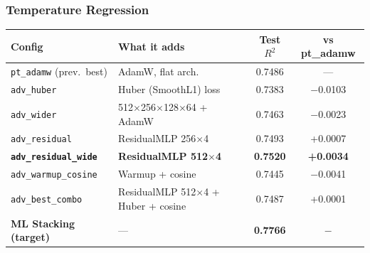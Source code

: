 \documentclass[11pt,a4paper]{article}
\begin{document}
\subsubsection*{Temperature Regression}

\begin{center}
\small
\begin{tabular}{llcc}
\toprule
\textbf{Config} & \textbf{What it adds} & \textbf{Test $R^2$} & \textbf{vs pt\_adamw} \\
\midrule
\texttt{pt\_adamw} (prev.\ best)   & AdamW, flat arch.   & 0.7486 & --- \\
\midrule
\texttt{adv\_huber}         & Huber (SmoothL1) loss & 0.7383 & $-$0.0103 \\
\texttt{adv\_wider}         & 512$\times$256$\times$128$\times$64 + AdamW & 0.7463 & $-$0.0023 \\
\texttt{adv\_residual}      & ResidualMLP 256$\times$4 & 0.7493 & +0.0007 \\
\textbf{\texttt{adv\_residual\_wide}} & \textbf{ResidualMLP 512$\times$4} & \textbf{0.7520} & \textbf{+0.0034} \\
\texttt{adv\_warmup\_cosine}& Warmup + cosine    & 0.7445 & $-$0.0041 \\
\texttt{adv\_best\_combo}   & ResidualMLP 512$\times$4 + Huber + cosine & 0.7487 & +0.0001 \\
\midrule
\textbf{ML Stacking (target)} & --- & \textbf{0.7766} & $-$ \\
\bottomrule
\end{tabular}
\end{center}
\end{document}

